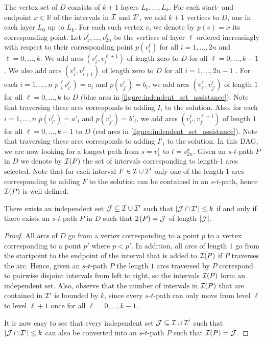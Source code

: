 The vertex set of $D$ consists of $k+1$ layers $L_0, \dots, L_k$. For each start- and endpoint $x \in \mathbb{R}$ of the intervals in $\mathcal{I}$ and $\mathcal{I}'$, we add $k+1$ vertices to $D$,
one in each layer $L_0$ up to $L_k$. For each such vertex $v$, we denote by $p(v) = x$ its corresponding point.
Let $v_1^{\ell}, \dots, v_{2n}^{\ell}$ be the vertices of layer $\ell$ ordered increasingly with respect to 
their corresponding point $p(v_i^{\ell})$ for all $i=1,\dots,2n$ and $\ell=0,\dots,k$.
We add arcs $(v_i^{\ell}, v_i^{\ell+1})$ of length zero to $D$ for all $\ell=0,\dots,k-1$ .
We also add arcs $(v_i^{\ell}, v_{i+1}^{\ell})$ of length zero to $D$ for all $i=1,\dots,2n-1$ .
For each $i=1,\dots,n$  $p(v_{i'}^{\ell}) = a_i$ and $p(v_{j'}^{\ell})=b_i$, we add arcs 
$(v_{i'}^{\ell}, v_{j'}^{\ell})$ of length $1$ for all $\ell=0,\dots, k$ to $D$ (blue arcs in \cref{figure:indendent_set_assistance}). Note that traversing these arcs corresponds 
to adding $I_i$ to the solution. Also, for each $i=1,\dots,n$  $p(v_{i'}^{\ell}) = a'_i$ and $p(v_{j'}^{\ell})=b'_i$, we add arcs 
$(v_{i'}^{\ell}, v_{j'}^{\ell+1})$ of length $1$ for all $\ell=0,\dots,k-1$ to $D$ (red arcs in \cref{figure:indendent_set_assistance}). Note that traversing these arcs corresponds 
to adding $I'_i$ to the solution. In this DAG, we are now looking for a longest path from 
$s=v_1^1$ to $t=v_{2n}^k$. Given an $s$-$t$-path $P$ in $D$ we denote by $\mathcal{I}(P)$ 
the set of intervals corresponding to length-1 arcs selected.
Note that for each interval $F \in \mathcal{I} \cup \mathcal{I}'$ 
only one of the length-1 arcs corresponding to adding $F$ to the solution can be 
contained in an $s$-$t$-path, hence $\mathcal{I}(P)$ is well defined.

\begin{lemma}
    There exists an independent set $\mathcal{J} \subseteq \mathcal{I} \cup \mathcal{I}'$ such that 
    $ |\mathcal{J} \cap \mathcal{I}'| \leq k$ if and only if there exists an $s$-$t$-path $P$ 
    in $D$ such that $\mathcal{I}(P) = \mathcal{J}$ of length $|\mathcal{J}|$.
\end{lemma}
\begin{proof}
    All arcs of $D$ go from a vertex corresponding to a point $p$ 
    to a vertex corresponding to a point $p'$ where $p < p'$. In addition,
    all arcs of length $1$ go from the startpoint to the endpoint of the 
    interval that is added to $\mathcal{I}(P)$ if $P$ traverses the arc. Hence, given an
    $s$-$t$-path $P$ the length $1$ arcs traversed by $P$ correspond to 
    pairwise disjoint intervals from left to right, so the intervals $\mathcal{I}(P)$ form an 
    independent set. Also, observe that the number of intervals in $\mathcal{I}(P)$ that 
    are contained in $\mathcal{I}'$ is bounded by $k$, since every $s$-$t$-path can only 
    move from level $\ell$ to level $\ell+1$ once for all $\ell=0,\dots,k-1$.

    It is now easy to see that every independent set $\mathcal{J} \subseteq \mathcal{I} \cup \mathcal{I}'$ such that 
$ |\mathcal{J} \cap \mathcal{I}'| \leq k$ can also be converted into an $s$-$t$-path $P$ such that $\mathcal{I}(P) = \mathcal{J}$.
 \end{proof}

